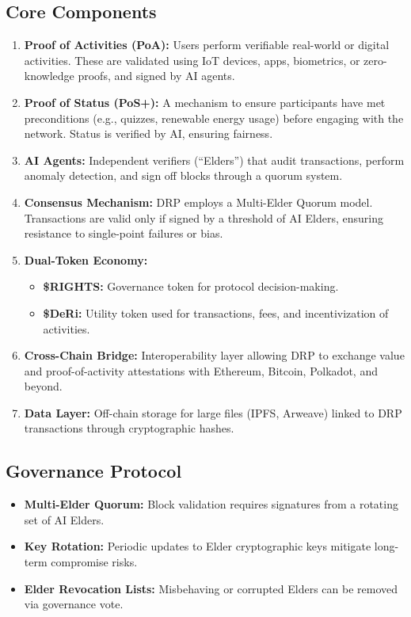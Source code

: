 \documentclass[11pt,a4paper]{article}
\begin{document}
\subsection{Core Components}
\begin{enumerate}
    \item \textbf{Proof of Activities (PoA):} Users perform verifiable real-world or digital activities. These are validated using IoT devices, apps, biometrics, or zero-knowledge proofs, and signed by AI agents.
    \item \textbf{Proof of Status (PoS+):} A mechanism to ensure participants have met preconditions (e.g., quizzes, renewable energy usage) before engaging with the network. Status is verified by AI, ensuring fairness.
    \item \textbf{AI Agents:} Independent verifiers (“Elders”) that audit transactions, perform anomaly detection, and sign off blocks through a quorum system.
    \item \textbf{Consensus Mechanism:} DRP employs a Multi-Elder Quorum model. Transactions are valid only if signed by a threshold of AI Elders, ensuring resistance to single-point failures or bias.
    \item \textbf{Dual-Token Economy:} 
        \begin{itemize}
            \item \textbf{\$RIGHTS:} Governance token for protocol decision-making. 
            \item \textbf{\$DeRi:} Utility token used for transactions, fees, and incentivization of activities.
        \end{itemize}
    \item \textbf{Cross-Chain Bridge:} Interoperability layer allowing DRP to exchange value and proof-of-activity attestations with Ethereum, Bitcoin, Polkadot, and beyond.
    \item \textbf{Data Layer:} Off-chain storage for large files (IPFS, Arweave) linked to DRP transactions through cryptographic hashes.
\end{enumerate}

\subsection{Governance Protocol}
\begin{itemize}
    \item \textbf{Multi-Elder Quorum:} Block validation requires signatures from a rotating set of AI Elders. 
    \item \textbf{Key Rotation:} Periodic updates to Elder cryptographic keys mitigate long-term compromise risks.
    \item \textbf{Elder Revocation Lists:} Misbehaving or corrupted Elders can be removed via governance vote.
\end{itemize}
\end{document}

